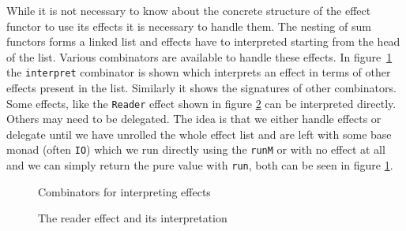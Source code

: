 While it is not necessary to know about the concrete structure of the effect
functor to use its effects it is necessary to handle them. The nesting of sum
functors forms a linked list and effects have to interpreted starting from the
head of the list. Various combinators are available to handle these effects. In
figure~\ref{fig:interpreting} the \texttt{interpret} combinator is shown which
interprets an effect in terms of other effects present in the list. Similarly it
shows the signatures of other combinators. Some effects, like the
\texttt{Reader} effect shown in figure \ref{fig:reader-effect} can be
interpreted directly. Others may need to be delegated. The idea is that we
either handle effects or delegate until we have unrolled the whole effect list
and are left with some base monad (often \texttt{IO}) which we run directly
using the \texttt{runM} or with no effect at all and we can simply return the
pure value with \texttt{run}, both can be seen in figure \ref{fig:interpreting}.

\begin{figure}
  
  \caption{Combinators for interpreting effects}
  \label{fig:interpreting}
\end{figure}

\begin{figure}
  
  \caption{The reader effect and its interpretation}
  \label{fig:reader-effect}
\end{figure}

